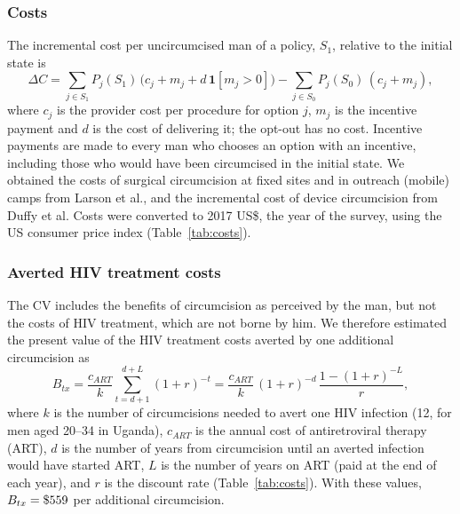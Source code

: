 \documentclass[11pt]{article}
\numberwithin{equation}{section}\numberwithin{figure}{section}\numberwithin{table}{section}
\begin{document}
\subsubsection{Costs}
The incremental cost per uncircumcised man of a policy, $S_1$, relative to the initial state is
\begin{equation}\label{eq:cost}
\Delta C = \sum_{j \in S_1} P_j(S_1)\,\big(c_j + m_j + d\,\mathbf{1}[m_j > 0]\big) - \sum_{j \in S_0} P_j(S_0)\,(c_j + m_j),
\end{equation}
where $c_j$ is the provider cost per procedure for option $j$, $m_j$ is the incentive payment and $d$ is the cost of delivering it; the opt-out has no cost. Incentive payments are made to every man who chooses an option with an incentive, including those who would have been circumcised in the initial state. We obtained the costs of surgical circumcision at fixed sites and in outreach (mobile) camps from Larson et al.,\cite{RN296} and the incremental cost of device circumcision from Duffy et al.\cite{RN198} Costs were converted to 2017 US\$, the year of the survey, using the US consumer price index (Table~\ref{tab:costs}).

\begin{table}[!htbp]
\centering
\caption{Cost inputs (2017 US\$), ranges for the one-way analyses and distributions for the probabilistic analysis.}\label{tab:costs}
\footnotesize
{}
\end{table}

\subsubsection{Averted HIV treatment costs}
The CV includes the benefits of circumcision as perceived by the man, but not the costs of HIV treatment, which are not borne by him. We therefore estimated the present value of the HIV treatment costs averted by one additional circumcision as
\begin{equation}\label{eq:tx}
B_{tx} = \frac{c_{ART}}{k} \sum_{t=d+1}^{d+L} (1+r)^{-t} = \frac{c_{ART}}{k}\,(1+r)^{-d}\,\frac{1 - (1+r)^{-L}}{r},
\end{equation}
where $k$ is the number of circumcisions needed to avert one HIV infection (12, for men aged 20--34 in Uganda\cite{Kripke2016}), $c_{ART}$ is the annual cost of antiretroviral therapy (ART), $d$ is the number of years from circumcision until an averted infection would have started ART, $L$ is the number of years on ART (paid at the end of each year), and $r$ is the discount rate (Table~\ref{tab:costs}). With these values, $B_{tx} = \$559$ per additional circumcision.
\end{document}
